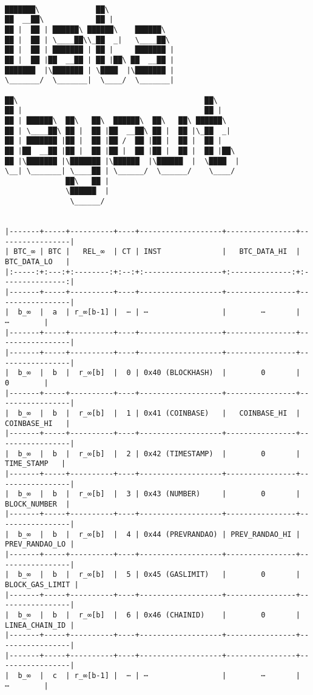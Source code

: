 \documentclass[varwidth=\maxdimen,margin=0.5cm,multi={verbatim}]{standalone}
\begin{document}
\begin{verbatim}

███████\             ██\                              
██  __██\            ██ |                             
██ |  ██ | ██████\ ██████\    ██████\                 
██ |  ██ | \____██\\_██  _|   \____██\                
██ |  ██ | ███████ | ██ |     ███████ |               
██ |  ██ |██  __██ | ██ |██\ ██  __██ |               
███████  |\███████ | \████  |\███████ |               
\_______/  \_______|  \____/  \_______|               
                                                      
██\                                           ██\     
██ |                                          ██ |    
██ | ██████\  ██\   ██\  ██████\  ██\   ██\ ██████\   
██ | \____██\ ██ |  ██ |██  __██\ ██ |  ██ |\_██  _|  
██ | ███████ |██ |  ██ |██ /  ██ |██ |  ██ |  ██ |    
██ |██  __██ |██ |  ██ |██ |  ██ |██ |  ██ |  ██ |██\ 
██ |\███████ |\███████ |\██████  |\██████  |  \████  |
\__| \_______| \____██ | \______/  \______/    \____/ 
              ██\   ██ |                              
              \██████  |                              
               \______/


|-------+-----+----------+----+-------------------+----------------+-----------------|
| BTC_∞ | BTC |   REL_∞  | CT | INST              |   BTC_DATA_HI  |   BTC_DATA_LO   |
|:-----:+:---:+:--------:+:--:+:------------------+:--------------:+:---------------:|
|-------+-----+----------+----+-------------------+----------------+-----------------|
|  b_∞  |  a  | r_∞[b-1] |  ⋯ | ⋯                 |        ⋯       |        ⋯        |
|-------+-----+----------+----+-------------------+----------------+-----------------|
|-------+-----+----------+----+-------------------+----------------+-----------------|
|  b_∞  |  b  |  r_∞[b]  |  0 | 0x40 (BLOCKHASH)  |        0       |        0        |
|-------+-----+----------+----+-------------------+----------------+-----------------|
|  b_∞  |  b  |  r_∞[b]  |  1 | 0x41 (COINBASE)   |   COINBASE_HI  |   COINBASE_HI   |
|-------+-----+----------+----+-------------------+----------------+-----------------|
|  b_∞  |  b  |  r_∞[b]  |  2 | 0x42 (TIMESTAMP)  |        0       |    TIME_STAMP   |
|-------+-----+----------+----+-------------------+----------------+-----------------|
|  b_∞  |  b  |  r_∞[b]  |  3 | 0x43 (NUMBER)     |        0       |   BLOCK_NUMBER  |
|-------+-----+----------+----+-------------------+----------------+-----------------|
|  b_∞  |  b  |  r_∞[b]  |  4 | 0x44 (PREVRANDAO) | PREV_RANDAO_HI |  PREV_RANDAO_LO |
|-------+-----+----------+----+-------------------+----------------+-----------------|
|  b_∞  |  b  |  r_∞[b]  |  5 | 0x45 (GASLIMIT)   |        0       | BLOCK_GAS_LIMIT |
|-------+-----+----------+----+-------------------+----------------+-----------------|
|  b_∞  |  b  |  r_∞[b]  |  6 | 0x46 (CHAINID)    |        0       |  LINEA_CHAIN_ID |
|-------+-----+----------+----+-------------------+----------------+-----------------|
|-------+-----+----------+----+-------------------+----------------+-----------------|
|  b_∞  |  c  | r_∞[b-1] |  ⋯ | ⋯                 |        ⋯       |        ⋯        |


\end{verbatim}
\end{document}
